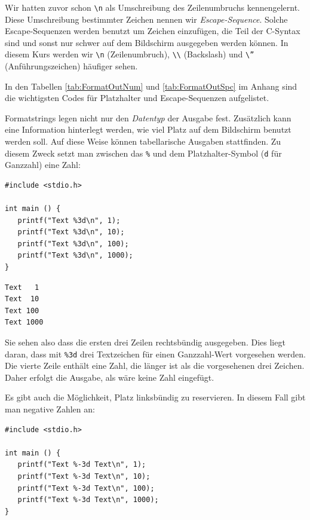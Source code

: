 Wir hatten zuvor schon \texttt{\textbackslash n} als Umschreibung des Zeilenumbruchs kennengelernt. Diese Umschreibung bestimmter Zeichen nennen wir \emph{Escape-Sequence}. Solche Escape-Sequenzen werden benutzt um Zeichen einzufügen, die Teil der C-Syntax sind und sonst nur schwer auf dem Bildschirm ausgegeben werden können. In diesem Kurs werden wir \texttt{\textbackslash n} (Zeilenumbruch), \texttt{\textbackslash \textbackslash} (Backslash) und \texttt{\textbackslash ''} (Anführungszeichen) häufiger sehen.

In den Tabellen \ref{tab:FormatOutNum} und \ref{tab:FormatOutSpc} im Anhang sind die wichtigsten Codes für Platzhalter und Escape-Sequenzen aufgelistet.

Formatstrings legen nicht nur den \emph{Datentyp} der Ausgabe fest. Zusätzlich kann eine Information hinterlegt werden, wie viel Platz auf dem Bildschirm benutzt werden soll. Auf diese Weise können tabellarische Ausgaben stattfinden. Zu diesem Zweck setzt man zwischen das \texttt{\%} und dem Platzhalter-Symbol (\eg \texttt{d} für Ganzzahl) eine Zahl:

\begin{codebox}
\begin{verbatim}
#include <stdio.h>

int main () {
   printf("Text %3d\n", 1);
   printf("Text %3d\n", 10);
   printf("Text %3d\n", 100);
   printf("Text %3d\n", 1000);
}
\end{verbatim}
\end{codebox}

\begin{cmdbox}
\begin{verbatim}
Text   1
Text  10
Text 100
Text 1000
\end{verbatim}
\end{cmdbox}

Sie sehen also dass die ersten drei Zeilen rechtsbündig ausgegeben. Dies liegt daran, dass mit \texttt{\%3d} drei Textzeichen für einen Ganzzahl-Wert vorgesehen werden. Die vierte Zeile enthält eine Zahl, die länger ist als die vorgesehenen drei Zeichen. Daher erfolgt die Ausgabe, als wäre keine Zahl eingefügt.

Es gibt auch die Möglichkeit, Platz linksbündig zu reservieren. In diesem Fall gibt man negative Zahlen an:


\begin{codebox}
\begin{verbatim}
#include <stdio.h>

int main () {
   printf("Text %-3d Text\n", 1);
   printf("Text %-3d Text\n", 10);
   printf("Text %-3d Text\n", 100);
   printf("Text %-3d Text\n", 1000);
}
\end{verbatim}
\end{codebox}

